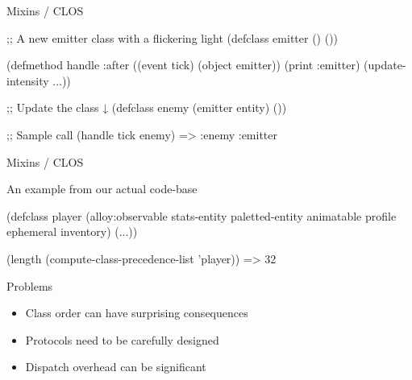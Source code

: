 \documentclass[14pt,t,aspectratio=169]{beamer}
\renewcommand{\title}[1]{
  {\huge #1} \vskip 0.4cm
}
\begin{document}
\begin{frame}[fragile]
  \title{Mixins / CLOS}
\begin{lispcode}
;; A new emitter class with a flickering light
(defclass emitter () ())

(defmethod handle :after ((event tick) (object emitter))
  (print :emitter)
  (update-intensity ...))
\end{lispcode}
  \pause\vspace{0.5cm}
\begin{lispcode}
;; Update the class ↓
(defclass enemy (emitter entity) ())

;; Sample call
(handle tick enemy)
=> :enemy :emitter
\end{lispcode}
\end{frame}

\begin{frame}[fragile]
  \title{Mixins / CLOS}
  An example from our actual code-base
  \vspace{0.5cm}
\begin{lispcode}
(defclass player (alloy:observable stats-entity
                  paletted-entity animatable
                  profile ephemeral inventory)
  (...))
\end{lispcode}
  \pause\vspace{0.5cm}
\begin{lispcode}
(length (compute-class-precedence-list 'player))
=> 32
\end{lispcode}
\end{frame}

\begin{frame}
  \title{Problems}
  \begin{itemize}
  \item Class order can have surprising consequences
  \item Protocols need to be carefully designed
  \item Dispatch overhead can be significant
  \end{itemize}
\end{frame}
\end{document}
